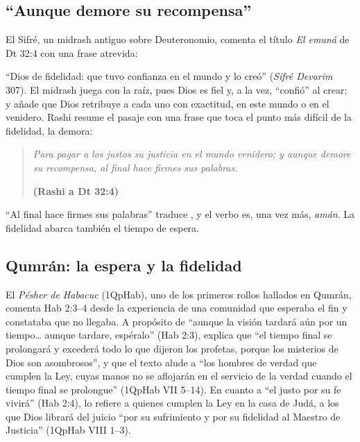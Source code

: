\subsection{“Aunque demore su recompensa”}
El Sifré, un midrash antiguo sobre Deuteronomio, comenta el título \emph{El emuná} de Dt 32:4 con una frase atrevida:


``Dios de fidelidad: que tuvo confianza en el mundo y lo creó'' (\emph{Sifré Devarim} 307). El midrash juega con la raíz, pues Dios es fiel y, a la vez, ``confió'' al crear; y añade que Dios retribuye a cada uno con exactitud, en este mundo o en el venidero. Rashi resume el pasaje con una frase que toca el punto más difícil de la fidelidad, la demora:

\begin{quote}\itshape
Para pagar a los justos su justicia en el mundo venidero; y aunque demore su recompensa, al final hace firmes sus palabras.\par\hfill{\upshape\small\bfseries\textcolor{azul}{(Rashi a Dt 32:4)}}
\end{quote}

``Al final hace firmes sus palabras'' traduce , y el verbo es, una vez más, \emph{amán}. La fidelidad abarca también el tiempo de espera.


\subsection{Qumrán: la espera y la fidelidad}
El \emph{Pésher de Habacuc} (1QpHab), uno de los primeros rollos hallados en Qumrán, comenta Hab 2:3--4 desde la experiencia de una comunidad que esperaba el fin y constataba que no llegaba. A propósito de ``aunque la visión tardará aún por un tiempo\ldots{} aunque tardare, espéralo'' (Hab 2:3), explica que ``el tiempo final se prolongará y excederá todo lo que dijeron los profetas, porque los misterios de Dios son asombrosos'', y que el texto alude a ``los hombres de verdad que cumplen la Ley, cuyas manos no se aflojarán en el servicio de la verdad cuando el tiempo final se prolongue'' (1QpHab VII 5--14). En cuanto a ``el justo por su fe vivirá'' (Hab 2:4), lo refiere a quienes cumplen la Ley en la casa de Judá, a los que Dios librará del juicio ``por su sufrimiento y por su fidelidad al Maestro de Justicia'' (1QpHab VIII 1--3).

